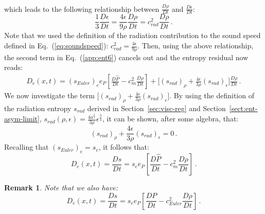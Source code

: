 \documentclass[review]{elsarticle}
\newtheorem{remark}{Remark}[section]
\newcommand{\eqt}[1]{Eq.~(\ref{#1})}                     %
\newcommand{\eqts}[1]{Eqs.~(\ref{#1})}                     %
\newcommand{\sect}[1]{Section~\ref{#1}}                     %
\begin{document}
\begin{appendices}
\begin{align}
\end{align}
%
which leads to the following relationship between $\frac{D \rho}{D t}$ and $\frac{D \epsilon}{D t}$:
%
\begin{equation}\label{eq:app7}
\frac{1}{3} \frac{D \epsilon}{D t} =  \frac{4 \epsilon}{9\rho} \frac{D \rho}{D t} = c^2_{rad}\frac{D \rho}{D t} \,.
\end{equation}
%
Note that we used the definition of the radiation contribution to the sound speed defined in \eqt{eq:soundspeed}: $c_{rad}^2 = \frac{4 \epsilon}{9 \rho}$. Then, using the above relationship, the second term in \eqt{app:ent6} cancels out and the entropy residual now reads:
%
\begin{multline}\label{app:ent8}
D_e(x,t) = (s_{Euler})_e e_P\left[ \frac{D \hat{P}}{Dt} - c^2_m \frac{D \rho}{Dt} \right]  +  \Big[ (s_{rad})_\rho +  \frac{4 \epsilon}{3\rho} (s_{rad})_\epsilon\Big]  \frac{D \rho}{Dt} \,.
\end{multline}
%
We now investigate the term $\Big[ (s_{rad})_\rho +  \frac{4 \epsilon}{3\rho} (s_{rad})_\epsilon\Big]$. By using the definition of the radiation entropy $s_{rad}$ derived in \sect{sec:visc-reg} and \sect{sect:ent-asym-limit}, $s_{rad}(\rho, \epsilon) = \frac{4 a^\frac{1}{4}}{3 \rho} \epsilon^\frac{3}{4}$, it can be shown, after some algebra, that:
%
\begin{equation}
(s_{rad})_\rho +  \frac{4 \epsilon}{3\rho} (s_{rad})_\epsilon = 0 \, .\nonumber
\end{equation}
% 
Recalling that $(s_{Euler})_e = s_e$, it follows that:
%
\begin{equation}
D_e(x,t) = \frac{D s}{D t} = s_e e_P\left[ \frac{D \hat{P}}{Dt} - c^2_m \frac{D \rho}{Dt} \right] \, . \nonumber
\end{equation}
% 
\begin{remark}
Note that we also have:
%
\begin{equation}
D_e(x,t) = \frac{D s}{D t} = s_e e_P\left[ \frac{D P}{Dt} - c^2_{Euler} \frac{D \rho}{Dt} \right] \, . \nonumber
\end{equation}
%
\end{remark}

\end{appendices}
\end{document}
